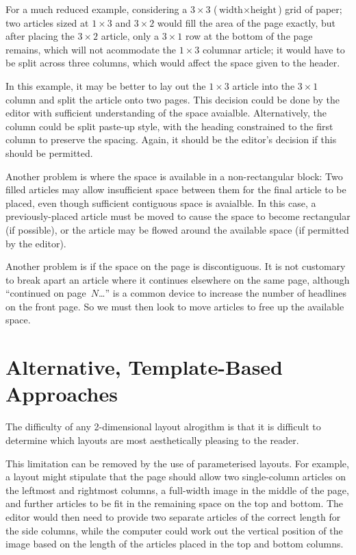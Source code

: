 \documentclass[a4paper]{scrartcl}
\begin{document}
For a much reduced example, considering a $3 \times 3$ ($\mbox{width}
\times \mbox{height}$) grid of paper; two articles sized at $1 \times 3$ and
$3 \times 2$ would fill the area of the page exactly, but after placing the
$3 \times 2$ article, only a $3 \times 1$ row at the bottom of the page remains,
which will not acommodate the $1 \times 3$ columnar article; it would have to
be split across three columns, which would affect the space given to
the header.

In this example, it may be better to lay out the $1 \times 3$ article into
the $3 \times 1$ column and split the article onto two pages. This decision
could be done by the editor with sufficient understanding of the space
avaialble. Alternatively, the column could be split paste-up style,
with the heading constrained to the first column to preserve the
spacing. Again, it should be the editor's decision if this should be
permitted.

Another problem is where the space is available in a non-rectangular
block: Two filled articles may allow insufficient space between them
for the final article to be placed, even though sufficient contiguous
space is avaialble. In this case, a previously-placed article must be
moved to cause the space to become rectangular (if possible), or the
article may be flowed around the available space (if permitted by the
editor).

Another problem is if the space on the page is discontiguous. It is
not customary to break apart an article where it continues elsewhere
on the same page, although ``continued on page~$N$\dots'' is a common
device to increase the number of headlines on the front page. So we
must then look to move articles to free up the available space.


\section{Alternative, Template-Based Approaches}

The difficulty of any 2-dimensional layout alrogithm is that it is
difficult to determine which layouts are most aesthetically pleasing
to the reader.

This limitation can be removed by the use of parameterised layouts.
For example, a layout might stipulate that the page should allow two
single-column articles on the leftmost and rightmost columns, a
full-width image in the middle of the page, and further articles to be
fit in the remaining space on the top and bottom. The editor would
then need to provide two separate articles of the correct length for
the side columns, while the computer could work out the vertical
position of the image based on the length of the articles placed in
the top and bottom columns.
\end{document}
